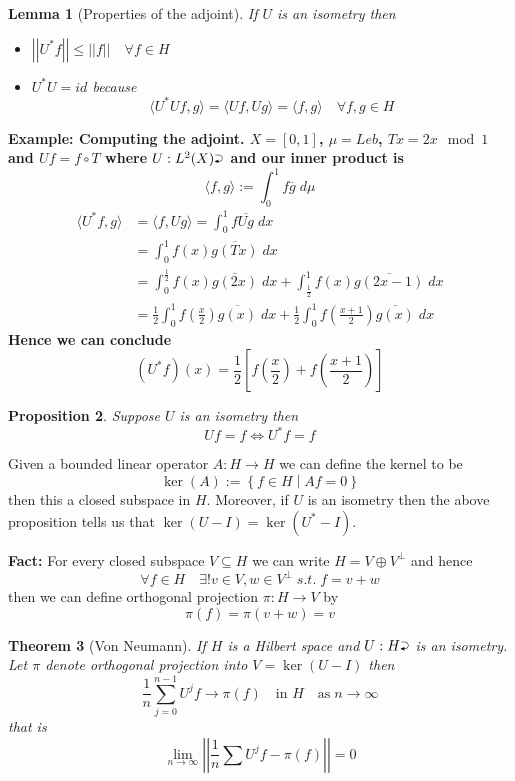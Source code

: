 \documentclass[11pt]{article}
\newcommand{\defeq}{:=}
\newcommand{\norm}[1]{\left|\left|#1\right|\right|}
\newcommand{\relmiddle}[1]{\mathrel{}\middle#1\mathrel{}}
\newcommand{\rmv}{\relmiddle|}
\newcommand{\toitself}{\mathbin{\scalebox{.85}{%
    \lefteqn{\scalebox{.5}{$\blacktriangleleft$}}\raisebox{.34ex}{$\supset$}}}}
\newcommand{\mdf}[1]{{\color{red} #1}}
\newenvironment{eg}
	{\begin{mdframed}[backgroundcolor=mylg,roundcorner=5pt,linewidth=0pt]\bfseries{Example:}\normalfont}
	{\end{mdframed}}
\newtheorem{prop}{Proposition}[section]
\newtheorem{theorem}[prop]{Theorem}
\newtheorem{lemma}[prop]{Lemma}
\begin{document}
\begin{lemma}[Properties of the adjoint]
If $U$ is an isometry then 
\begin{itemize}
	\item $\norm{U^\ast f} \leq \norm{f} \quad \forall f\in H$
	\item $U^\ast U = id $ because
		\[
		\langle U^\ast U f, g \rangle = \langle Uf, Ug\rangle = \langle f, g\rangle \quad \forall f,g \in H
		\]
\end{itemize}
\end{lemma}
\begin{eg}
	\textbf{Computing the adjoint.}
	$X=[0,1]$, $\mu=Leb$, $Tx=2x \mod 1$ and $Uf = f\circ T$ where $U:L^2(X)\toitself$ and our inner product is
	\[
		\langle f, g\rangle \defeq \int_0^1 f \overline{g} \; d\mu
	\]
	\begin{align*}
		\langle U^\ast f, g\rangle & = \langle f, Ug\rangle = \int_0^1 f \overline{Ug} \; dx \\
								   & = \int_0^1 f(x)\overline{g(Tx)}\; dx \\
								   & = \int_0^{\frac{1}{2}} f(x)\overline{g(2x)} \; dx + \int_{\frac{1}{2}}^1 f(x)\overline{g(2x-1)}\; dx \\
								   & = \frac{1}{2}\int_0^1 f\left( \frac{x}{2}\right)\overline{g(x)}\; dx + 
										\frac{1}{2}\int_0^1 f\left( \frac{x+1}{2}\right)\overline{g(x)}\; dx
	\end{align*}
	Hence we can conclude 
	\[
		(U^\ast f)(x) = \frac{1}{2}\left[ f \left( \frac{x}{2}\right) + f \left( \frac{x+1}{2}\right)\right]
	\]
\end{eg}

\begin{prop}
Suppose $U$ is an isometry then
\[
Uf=f \iff U^\ast f = f
\]
\end{prop}

Given a bounded linear operator $A:H\to H$ we can define the \mdf{kernel} to be
\[
	\ker(A) \defeq \left\{ f\in H \rmv Af = 0\right\}
\]
then this a closed subspace in $H$.
Moreover, if $U$ is an isometry then the above proposition tells us that $\ker(U-I)=\ker(U^\ast - I)$.

\textbf{Fact: }
For every closed subspace $V\subseteq H$ we can write $H=V \oplus V^\perp$ and hence
\[
\forall f\in H \quad \exists ! v\in V, w\in V^\perp \; s.t. \; f= v+ w
\]
then we can define \mdf{orthogonal projection} $\pi: H \to V$ by
\[
	\pi(f) = \pi (v+ w) = v
\]

\begin{theorem}[Von Neumann]
If $H$ is a Hilbert space and $U:H\toitself$ is an isometry.
Let $\pi$ denote orthogonal projection into $V=\ker(U-I)$ then
\[
	\frac{1}{n}\sum_{j=0}^{n-1}U^j f \to \pi (f) \quad \text{in }H \quad \text{as} \; n\to \infty
\]
that is
\[
\lim_{n\to\infty}\norm{\frac{1}{n}\sum U^j f - \pi(f)} = 0
\]
\end{theorem}
\end{document}
